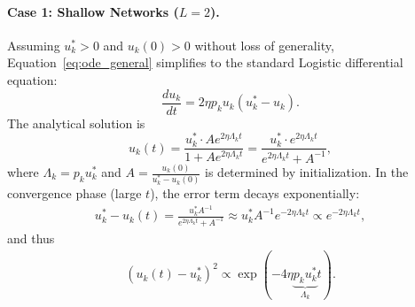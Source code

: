 \documentclass{article}
\theoremstyle{plain}
\theoremstyle{definition}
\theoremstyle{remark}
\begin{document}
\paragraph{Case 1: Shallow Networks ($L=2$).}
Assuming $u_k^* > 0$ and $u_k(0) > 0$ without loss of generality, Equation~\eqref{eq:ode_general} simplifies to the standard Logistic differential equation:
\begin{equation*}
    \frac{d u_k}{dt} = 2 \eta p_k u_k (u_k^* - u_k).
\end{equation*}
The analytical solution is
\begin{equation*}
    u_k(t) = \frac{u_k^* \cdot A e^{2 \eta \Lambda_k t}}{1 + A e^{2 \eta \Lambda_k t}} = \frac{u_k^* \cdot e^{2 \eta \Lambda_k t}}{e^{2 \eta \Lambda_k t} + A^{-1}},
\end{equation*}
where $\Lambda_k = p_k u_k^*$ and $A = \frac{u_k(0)}{u_k^* - u_k(0)}$ is determined by initialization.
In the convergence phase (large $t$), the error term decays exponentially:
\begin{align*}
    u_k^* - u_k(t) = \frac{u_k^* A^{-1}}{e^{2 \eta \Lambda_k t} + A^{-1}} \approx u_k^* A^{-1} e^{-2 \eta \Lambda_k t}
    \propto e^{-2 \eta \Lambda_k t},
\end{align*}
and thus
\begin{align}\label{eq:error_decay_L_2}
    (u_k(t)-u_k^*)^2 \propto \exp \left(-4 \eta \underbrace{p_k u_k^*}_{\Lambda_k} t\right).
\end{align}
\end{document}
